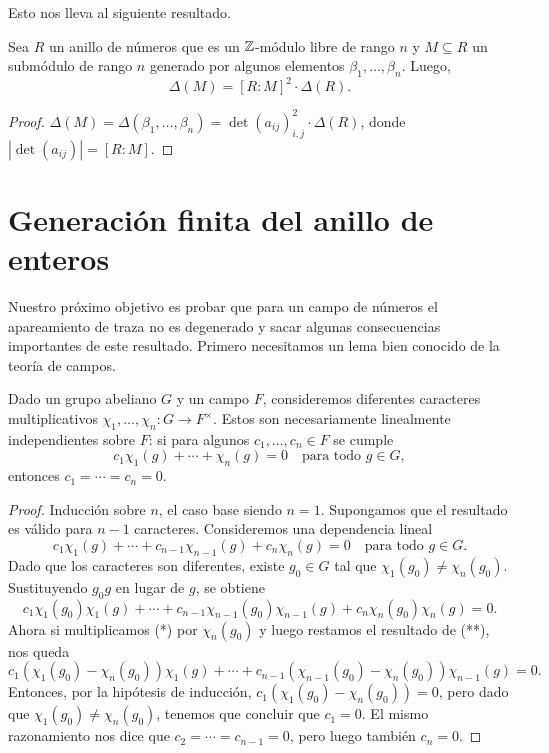 Esto nos lleva al siguiente resultado.

\begin{proposicion}
  \label{prop:discriminantes-e-indice}
  Sea $R$ un anillo de números que es un $\mathbb{Z}$-módulo libre de rango $n$
  y $M \subseteq R$ un submódulo de rango $n$ generado por algunos elementos
  $\beta_1,\ldots,\beta_n$. Luego,
  $$\Delta (M) = [R : M]^2 \cdot \Delta (R).$$

  \begin{proof}
    $\Delta (M) = \Delta (\beta_1,\ldots,\beta_n) = \det (a_{ij})_{i,j}^2 \cdot \Delta (R)$,
    donde $|\det (a_{ij})| = [R : M]$.
  \end{proof}
\end{proposicion}


\section{Generación finita del anillo de enteros}

Nuestro próximo objetivo es probar que para un campo de números
el apareamiento de traza no es degenerado y sacar algunas consecuencias
importantes de este resultado.
Primero necesitamos un lema bien conocido de la teoría de campos.

\begin{lema}
  Dado un grupo abeliano $G$ y un campo $F$, consideremos diferentes caracteres
  multiplicativos $\chi_1,\ldots,\chi_n\colon G\to F^\times$. Estos son
  necesariamente linealmente independientes sobre $F$: si para algunos
  $c_1,\ldots,c_n \in F$ se cumple
  $$c_1 \chi_1 (g) + \cdots + \chi_n (g) = 0 \quad\text{para todo }g\in G,$$
  entonces $c_1 = \cdots = c_n = 0$.

  \begin{proof}
    Inducción sobre $n$, el caso base siendo $n = 1$. Supongamos que
    el resultado es válido para $n-1$ caracteres.
    Consideremos una dependencia lineal
    \[ \tag{*} c_1 \chi_1 (g) + \cdots + c_{n-1} \chi_{n-1} (g) + c_n \chi_n (g)
       = 0 \quad\text{para todo }g\in G. \]
    Dado que los caracteres son diferentes, existe $g_0 \in G$ tal que $\chi_1
    (g_0) \ne \chi_n (g_0)$. Sustituyendo $g_0 g$ en lugar de $g$, se obtiene
    \[ \tag{**} c_1 \chi_1 (g_0) \chi_1 (g) + \cdots +
       c_{n-1} \chi_{n-1} (g_0) \chi_{n-1} (g) + c_n \chi_n (g_0) \chi_n (g) = 0. \]
    Ahora si multiplicamos (*) por $\chi_n (g_0)$ y luego restamos el resultado
    de (**), nos queda
    \[ c_1 (\chi_1 (g_0) - \chi_n (g_0)) \chi_1 (g) + \cdots +
       c_{n-1} (\chi_{n-1} (g_0) - \chi_n (g_0)) \chi_{n-1} (g) = 0. \]
    Entonces, por la hipótesis de inducción,
    $c_1 (\chi_1 (g_0) - \chi_n (g_0)) = 0$, pero dado que
    $\chi_1 (g_0) \ne \chi_n (g_0)$, tenemos que concluir que $c_1 = 0$.
    El mismo razonamiento nos dice que $c_2 = \cdots = c_{n-1} = 0$, pero luego
    también $c_n = 0$.
  \end{proof}
\end{lema}

